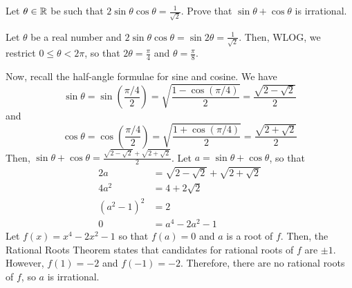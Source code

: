 \documentclass{agony}
\begin{document}
\begin{prob}
  Let $\theta \in \mathbb{R}$ be such that $2\sin\theta\cos\theta = \frac{1}{\sqrt{2}}$.
  Prove that $\sin\theta+\cos\theta$ is irrational.
\end{prob}
\begin{prf}
  Let $\theta$ be a real number and $2\sin\theta\cos\theta = \sin 2\theta = \frac{1}{\sqrt{2}}$.
  Then, WLOG, we restrict $0 \leq \theta < 2\pi$,
  so that $2\theta = \frac{\pi}{4}$ and $\theta = \frac{\pi}{8}$.

  Now, recall the half-angle formulae for sine and cosine. We have
  \[ \sin\theta = \sin(\frac{\pi/4}{2}) = \sqrt{\frac{1-\cos(\pi/4)}{2}} = \frac{\sqrt{2-\sqrt{2}}}{2} \]
  and
  \[ \cos\theta = \cos(\frac{\pi/4}{2}) = \sqrt{\frac{1+\cos(\pi/4)}{2}} = \frac{\sqrt{2+\sqrt{2}}}{2} \]
  Then, $\sin\theta + \cos\theta = \frac{\sqrt{2-\sqrt{2}}+\sqrt{2+\sqrt{2}}}{2}$.
  Let $a = \sin\theta+\cos\theta$, so that
  \begin{align*}
    2a          & = \sqrt{2-\sqrt{2}}+\sqrt{2+\sqrt{2}} \\
    4a^2        & = 4+2\sqrt{2}                         \\
    (a^2 - 1)^2 & = 2                                   \\
    0           & = a^4 - 2a^2 -1
  \end{align*}
  Let $f(x) = x^4 - 2x^2 - 1$ so that $f(a) = 0$ and $a$ is a root of $f$.
  Then, the Rational Roots Theorem states that candidates for rational roots of $f$ are $\pm 1$.
  However, $f(1) = -2$ and $f(-1) = -2$.
  Therefore, there are no rational roots of $f$, so $a$ is irrational.
\end{prf}
\end{document}
